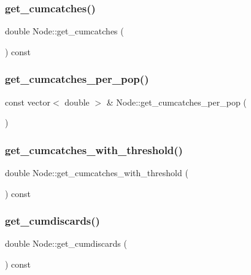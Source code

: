 \subsubsection{\texorpdfstring{get\_cumcatches()}{get\_cumcatches()}}
{\footnotesize\ttfamily double Node\+::get\+\_\+cumcatches (\begin{DoxyParamCaption}{ }\end{DoxyParamCaption}) const}

\mbox{\label{class_node_a37c67fea395e7b2a4f0667b7e6df20df}} 
\subsubsection{\texorpdfstring{get\_cumcatches\_per\_pop()}{get\_cumcatches\_per\_pop()}}
{\footnotesize\ttfamily const vector$<$ double $>$ \& Node\+::get\+\_\+cumcatches\+\_\+per\+\_\+pop (\begin{DoxyParamCaption}{ }\end{DoxyParamCaption})}

\mbox{\label{class_node_ab033cc01227c102414f8c0cc9431bbc8}} 
\subsubsection{\texorpdfstring{get\_cumcatches\_with\_threshold()}{get\_cumcatches\_with\_threshold()}}
{\footnotesize\ttfamily double Node\+::get\+\_\+cumcatches\+\_\+with\+\_\+threshold (\begin{DoxyParamCaption}{ }\end{DoxyParamCaption}) const}

\mbox{\label{class_node_ad51b6af7a2e1ecac96d39ce2cbe4f0f9}} 
\subsubsection{\texorpdfstring{get\_cumdiscards()}{get\_cumdiscards()}}
{\footnotesize\ttfamily double Node\+::get\+\_\+cumdiscards (\begin{DoxyParamCaption}{ }\end{DoxyParamCaption}) const}

